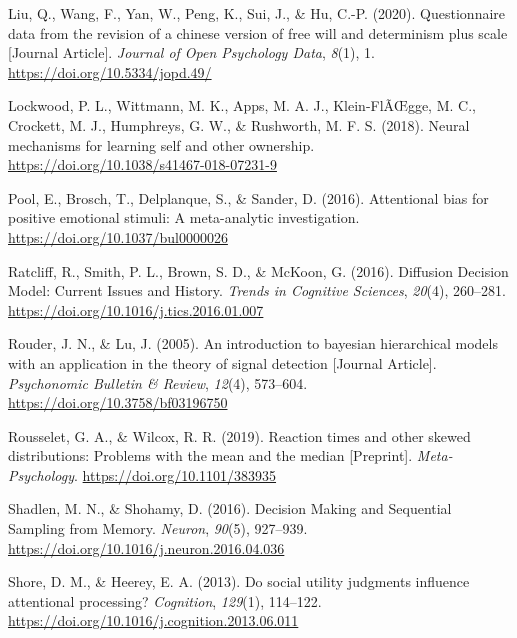 \documentclass[
  man]{apa6}
\newlength{\cslhangindent}
\newlength{\cslentryspacingunit} %
\newenvironment{CSLReferences}[2] %
 {%
  \setlength{\parindent}{0pt}
  \ifodd #1
  \let\oldpar\par
  \def\par{\hangindent=\cslhangindent\oldpar}
  \fi
  \setlength{\parskip}{#2\cslentryspacingunit}
 }%
 {}
\begin{document}
\begin{CSLReferences}{1}{0}
\leavevmode{}%
Liu, Q., Wang, F., Yan, W., Peng, K., Sui, J., \& Hu, C.-P. (2020). Questionnaire data from the revision of a chinese version of free will and determinism plus scale {[}Journal Article{]}. \emph{Journal of Open Psychology Data}, \emph{8}(1), 1. \url{https://doi.org/10.5334/jopd.49/}

\leavevmode{}%
Lockwood, P. L., Wittmann, M. K., Apps, M. A. J., Klein-FlÃŒgge, M. C., Crockett, M. J., Humphreys, G. W., \& Rushworth, M. F. S. (2018). Neural mechanisms for learning self and other ownership. \url{https://doi.org/10.1038/s41467-018-07231-9}

\leavevmode{}%
Pool, E., Brosch, T., Delplanque, S., \& Sander, D. (2016). Attentional bias for positive emotional stimuli: A meta-analytic investigation. \url{https://doi.org/10.1037/bul0000026}

\leavevmode{}%
Ratcliff, R., Smith, P. L., Brown, S. D., \& McKoon, G. (2016). Diffusion {Decision} {Model}: {Current} {Issues} and {History}. \emph{Trends in Cognitive Sciences}, \emph{20}(4), 260--281. \url{https://doi.org/10.1016/j.tics.2016.01.007}

\leavevmode{}%
Rouder, J. N., \& Lu, J. (2005). An introduction to bayesian hierarchical models with an application in the theory of signal detection {[}Journal Article{]}. \emph{Psychonomic Bulletin \& Review}, \emph{12}(4), 573--604. \url{https://doi.org/10.3758/bf03196750}

\leavevmode{}%
Rousselet, G. A., \& Wilcox, R. R. (2019). Reaction times and other skewed distributions: Problems with the mean and the median {[}Preprint{]}. \emph{Meta-Psychology}. \url{https://doi.org/10.1101/383935}

\leavevmode{}%
Shadlen, M. N., \& Shohamy, D. (2016). Decision {Making} and {Sequential} {Sampling} from {Memory}. \emph{Neuron}, \emph{90}(5), 927--939. \url{https://doi.org/10.1016/j.neuron.2016.04.036}

\leavevmode{}%
Shore, D. M., \& Heerey, E. A. (2013). Do social utility judgments influence attentional processing? \emph{Cognition}, \emph{129}(1), 114--122. \url{https://doi.org/10.1016/j.cognition.2013.06.011}


\end{CSLReferences}
\end{document}
